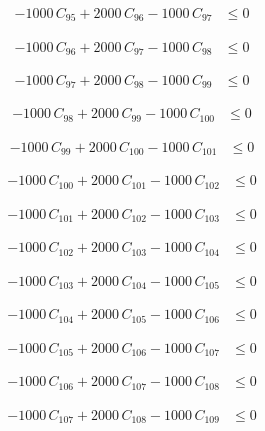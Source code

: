 \documentclass[a4paper,11pt]{article}
\begin{document}
\begin{align}
-1000\,C_{95} + 2000\,C_{96} - 1000\,C_{97} &\leq 0 \nonumber
\end{align}

\begin{align}
-1000\,C_{96} + 2000\,C_{97} - 1000\,C_{98} &\leq 0 \nonumber
\end{align}

\begin{align}
-1000\,C_{97} + 2000\,C_{98} - 1000\,C_{99} &\leq 0 \nonumber
\end{align}

\begin{align}
-1000\,C_{98} + 2000\,C_{99} - 1000\,C_{100} &\leq 0 \nonumber
\end{align}

\begin{align}
-1000\,C_{99} + 2000\,C_{100} - 1000\,C_{101} &\leq 0 \nonumber
\end{align}

\begin{align}
-1000\,C_{100} + 2000\,C_{101} - 1000\,C_{102} &\leq 0 \nonumber
\end{align}

\begin{align}
-1000\,C_{101} + 2000\,C_{102} - 1000\,C_{103} &\leq 0 \nonumber
\end{align}

\begin{align}
-1000\,C_{102} + 2000\,C_{103} - 1000\,C_{104} &\leq 0 \nonumber
\end{align}

\begin{align}
-1000\,C_{103} + 2000\,C_{104} - 1000\,C_{105} &\leq 0 \nonumber
\end{align}

\begin{align}
-1000\,C_{104} + 2000\,C_{105} - 1000\,C_{106} &\leq 0 \nonumber
\end{align}

\begin{align}
-1000\,C_{105} + 2000\,C_{106} - 1000\,C_{107} &\leq 0 \nonumber
\end{align}

\begin{align}
-1000\,C_{106} + 2000\,C_{107} - 1000\,C_{108} &\leq 0 \nonumber
\end{align}

\begin{align}
-1000\,C_{107} + 2000\,C_{108} - 1000\,C_{109} &\leq 0 \nonumber
\end{align}
\end{document}
